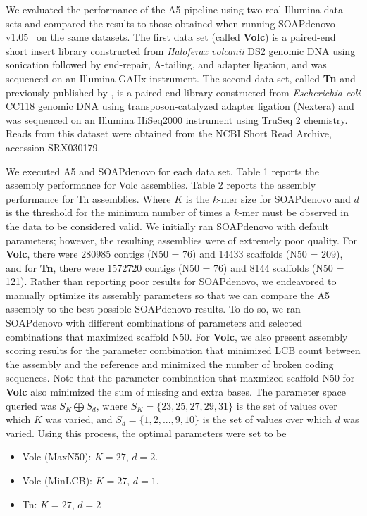 \documentclass{bioinfo}
\begin{document}
We evaluated the performance of the A5 pipeline using two real Illumina data sets and compared the results to
those obtained when running SOAPdenovo v1.05~\citep{Li2010} on the same datasets. The first data set (called \textbf{Volc}) is a paired-end short insert library constructed from \emph{Haloferax volcanii} DS2 genomic DNA 
using sonication followed by end-repair, A-tailing, and adapter ligation, and was sequenced on an Illumina GAIIx instrument. 
The second data set, called \textbf{Tn} and previously published by \citet{Adey2010}, is a paired-end library constructed from \emph{Escherichia coli} CC118 genomic DNA
using transposon-catalyzed adapter ligation (Nextera) and was sequenced on an Illumina HiSeq2000 instrument using TruSeq 2 chemistry. 
Reads from this dataset were obtained from the NCBI Short Read Archive, accession SRX030179.

We executed A5 and SOAPdenovo for each data set. Table 1 reports the assembly performance for Volc assemblies.
Table 2 reports the assembly performance for Tn assemblies. 
Where $K$ is the $k$-mer size for SOAPdenovo and $d$ is the threshold for the minimum number of times a $k$-mer must be observed in the data to be considered valid.
We initially ran SOAPdenovo with default parameters; however, the resulting assemblies were of extremely poor quality. For \textbf{Volc}, there were
280985 contigs (N50 = 76) and 14433 scaffolds (N50 = 209), and for \textbf{Tn}, there were 1572720 contigs (N50 = 76) and 8144 scaffolds (N50 = 121). 
Rather than reporting poor results for SOAPdenovo, we endeavored to manually optimize its assembly parameters so that we can compare the A5 assembly to the best possible SOAPdenovo results. 
To do so, we ran SOAPdenovo with different combinations of parameters and selected combinations that maximized scaffold N50. For \textbf{Volc},
we also present assembly scoring results for the parameter combination that minimized LCB count between the assembly and the reference and minimized
the number of broken coding sequences. Note that the parameter combination that maxmized scaffold N50 for \textbf{Volc} also minimized the sum
of missing and extra bases. The parameter space queried was $S_K \bigoplus S_d$,
where $S_K = \{23,25,27,29,31\}$ is the set of values over which $K$ was varied, and $S_d = \{1,2,...,9,10\}$ is the set of values over which $d$
was varied. Using this process, the optimal parameters were set to be
\begin{itemize}
\item Volc (MaxN50): $K = 27$, $d = 2$.
\item Volc (MinLCB): $K = 27$, $d = 1$.
\item Tn: $K = 27$, $d = 2$
\end{itemize}
\end{document}
